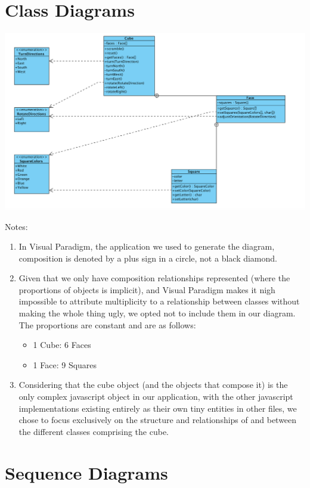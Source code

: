 \documentclass[12pt]{article}
\begin{document}
\section{Class Diagrams}

	\includegraphics[width = \textwidth]{diagram.PNG}
	
	\par Notes: \\
	
	\begin{enumerate}
	\item In Visual Paradigm, the application we used to generate the diagram, composition is denoted by a plus sign in a circle, not a black diamond.
	\item Given that we only have composition relationships represented (where the proportions of objects is implicit), and Visual Paradigm makes it nigh impossible to attribute multiplicity to a relationship between classes without making the whole thing ugly, we opted not to include them in our diagram. The proportions are constant and are as follows:
	\begin{itemize}
	\item 1 Cube: 6 Faces
	\item 1 Face: 9 Squares
	\end{itemize}
	\item Considering that the cube object (and the objects that compose it) is the only complex javascript object in our application, with the other javascript implementations existing entirely as their own tiny entities in other files, we chose to focus exclusively on the structure and relationships of and between the different classes comprising the cube.
	\end{enumerate}
	

\section{Sequence Diagrams}
\end{document}

